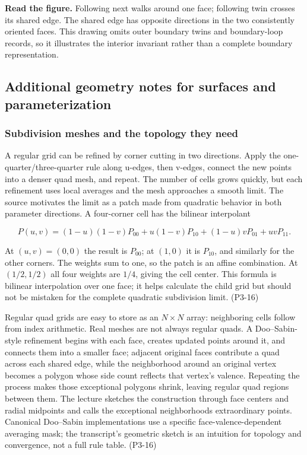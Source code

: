 \textbf{Read the figure.} Following next walks around one face; following twin crosses its shared edge. The shared edge has opposite directions in the two consistently oriented faces. This drawing omits outer boundary twins and boundary-loop records, so it illustrates the interior invariant rather than a complete boundary representation.

\subsection{Additional geometry notes for surfaces and parameterization}\label{03-visual-computing-i-ch002-additional-geometry-notes-for-surfaces-and-parameterization}

\hypertarget{03-visual-computing-i-ch002-additional-geometry-notes-for-surfaces-and-parameterization}{}

\subsubsection{Subdivision meshes and the topology they need}\label{03-visual-computing-i-ch002-subdivision-meshes-and-the-topology-they-need}

\hypertarget{03-visual-computing-i-ch002-subdivision-meshes-and-the-topology-they-need}{}

A regular grid can be refined by corner cutting in two directions. Apply the one-quarter/three-quarter rule along u-edges, then v-edges, connect the new points into a denser quad mesh, and repeat. The number of cells grows quickly, but each refinement uses local averages and the mesh approaches a smooth limit. The source motivates the limit as a patch made from quadratic behavior in both parameter directions. A four-corner cell has the bilinear interpolant

\[
P(u,v)=(1-u)(1-v)P_{00}+u(1-v)P_{10}+(1-u)vP_{01}+uvP_{11}.
\]

At \((u,v)=(0,0)\) the result is \(P_{00}\); at \((1,0)\) it is \(P_{10}\), and similarly for the other corners. The weights sum to one, so the patch is an affine combination. At \((1/2,1/2)\) all four weights are \(1/4\), giving the cell center. This formula is bilinear interpolation over one face; it helps calculate the child grid but should not be mistaken for the complete quadratic subdivision limit. (P3-16)

Regular quad grids are easy to store as an \(N\times N\) array: neighboring cells follow from index arithmetic. Real meshes are not always regular quads. A Doo--Sabin-style refinement begins with each face, creates updated points around it, and connects them into a smaller face; adjacent original faces contribute a quad across each shared edge, while the neighborhood around an original vertex becomes a polygon whose side count reflects that vertex's valence. Repeating the process makes those exceptional polygons shrink, leaving regular quad regions between them. The lecture sketches the construction through face centers and radial midpoints and calls the exceptional neighborhoods extraordinary points. Canonical Doo--Sabin implementations use a specific face-valence-dependent averaging mask; the transcript's geometric sketch is an intuition for topology and convergence, not a full rule table. (P3-16)

